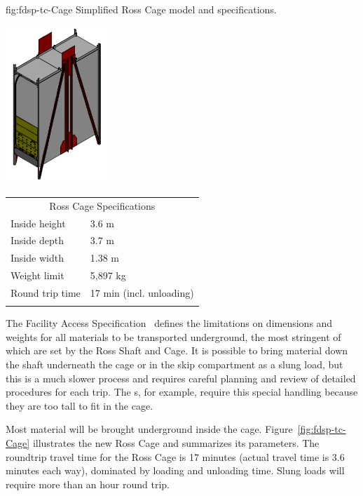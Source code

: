 \begin{dunefigure}
{fig:fdsp-tc-Cage}
{Simplified Ross Cage model and specifications.}
\parbox{2.1in}{\includegraphics[width=0.3\textwidth]{graphics/Cage-view.pdf}}
\qquad\hspace{10pt}
\begin{minipage}{0.5\textwidth}%
\begin{tabular}{p{3.4cm}p{3.4cm}}        
\multicolumn{2}{c}{Ross Cage Specifications}\\ \toprowrule
Inside height & 3.6 m\\ \colhline
Inside depth  & 3.7 m \\ \colhline
Inside width  & 1.38 m \\ \colhline
Weight limit  &  5,897 kg \\ \colhline
Round trip \newline time & 17 min \newline (incl. unloading) \\ \colhline
\end{tabular}
\end{minipage}
\end{dunefigure}

The  Facility Access Specification~\cite{bib:docdb328} defines the limitations on dimensions and weights for all materials to be transported underground, the most stringent of which are set by the Ross Shaft and Cage. 
It is possible to bring material down the shaft underneath the cage or in the skip compartment  as a slung load, but this is a much slower process and requires careful planning 
and review of detailed procedures for each trip. 
The  s, for example, require this special handling because they are too tall to fit in the cage. 

Most material will be brought underground inside the cage. Figure~\ref{fig:fdsp-tc-Cage} illustrates the new Ross Cage and summarizes its parameters.  
The roundtrip travel time for the Ross Cage is 17 minutes (actual travel time is \num{3.6} minutes each way), dominated by loading and unloading time.  
Slung loads will require more than an hour round trip.



